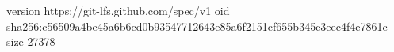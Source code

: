 version https://git-lfs.github.com/spec/v1
oid sha256:c56509a4be45a6b6cd0b93547712643e85a6f2151cf655b345e3eec4f4e7861c
size 27378
